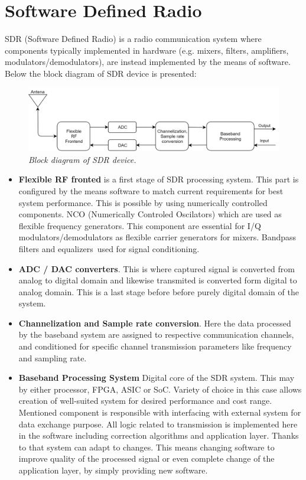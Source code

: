 \documentclass[en,printmode]{mgr}
\begin{document}
	\newpage
	\section{Software Defined Radio}
		SDR (Software Defined Radio) is a radio communication system where components typically
		 implemented in hardware 
		(e.g. mixers, filters, amplifiers, modulators/demodulators), are instead implemented
		 by the means of software.
		\\
		
		
		Below the block diagram of SDR device is presented:
		\begin{figure}[!htb]
    		\centering
   			\includegraphics[width=\textwidth]{diag/sdr.png}
    		\caption{\textit{Block diagram of SDR device.}}
		\end{figure}
		
		\begin{itemize}
			\item \textbf{Flexible RF fronted} is a first stage of SDR processing system. This part is configured by the means
			software to match current requirements for best system performance. This is possible by using numerically
			controlled components.
			NCO (Numerically Controled Oscilators) which are used as flexible frequency generators. This component are
			essential for I/Q modulators/demodulators as flexible carrier generators for mixers. Bandpass filters and equalizers\
			used for signal conditioning.
			
			\item \textbf{ADC / DAC converters}. This is where captured signal is converted from analog to digital domain and
			likewise transmited is converted form digital to analog domain. This is a last stage before before purely digital 
			domain of the system.
			
			\item \textbf{Channelization and Sample rate conversion}. Here the data processed by the baseband system are assigned
			to respective communication channels, and conditioned for specific channel transmission parameters like frequency and
			sampling rate.
			
			\item \textbf{Baseband Processing System} Digital core of the SDR system. This may by either processor, FPGA, ASIC or
			SoC. Variety of choice in this case allows creation of well-suited system for desired performance and cost range. 
			Mentioned component is responsible with interfacing with external system for data exchange purpose. All logic related to
			transmission is implemented here in the software including correction algorithms and application layer. Thanks to that
			system can adapt to changes. This means changing software to improve quality of the processed signal
			or even complete change of the application layer, by simply providing new software.
		\end{itemize}
		
\end{document}
